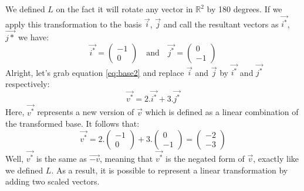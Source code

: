 \documentclass[600paper, 11pt,twoside,openany]{kdp}
\begin{document}
\indent We defined $L$ on the fact it will rotate any vector in  $\mathbb{R}^2$ by 180 degrees. If we apply this transformation to the basis $\overrightarrow{i}$, $\overrightarrow{j}$ and call the resultant vectors as $\overrightarrow{i^*}$, $\overrightarrow{j*}$ we have:
 \[\overrightarrow{i^*} = \begin{pmatrix}
 -1 \\
 0
 \end{pmatrix} \quad \textrm{and} \quad \overrightarrow{j^*} = \begin{pmatrix}
 0\\
 -1
 \end{pmatrix} \]
\indent Alright, let’s grab equation \ref{eq:base2} and replace  $\overrightarrow{i}$ and $\overrightarrow{j}$  by $\overrightarrow{i^*}$ and $\overrightarrow{j^*}$ respectively:
\[ \overrightarrow{v^*} = 2.\overrightarrow{i^*} + 3.\overrightarrow{j^*} \]
\indent Here, $\overrightarrow{v^*}$ represents a new version of $\overrightarrow{v}$ which is defined as a linear combination of the transformed base. It follows that:
\[ \overrightarrow{v^*} = 2.\begin{pmatrix}
 -1 \\
 0
 \end{pmatrix} + 3.\begin{pmatrix}
 0\\
 -1
 \end{pmatrix} = \begin{pmatrix}
 -2\\
 -3
 \end{pmatrix} \]
 Well, $\overrightarrow{v^*}$ is the same as $\overrightarrow{-v}$, meaning that $\overrightarrow{v^*}$ is the negated form of $\overrightarrow{v}$, exactly like we defined $L$. As a result, it is possible to represent a linear transformation by adding two scaled vectors.
\end{document}
